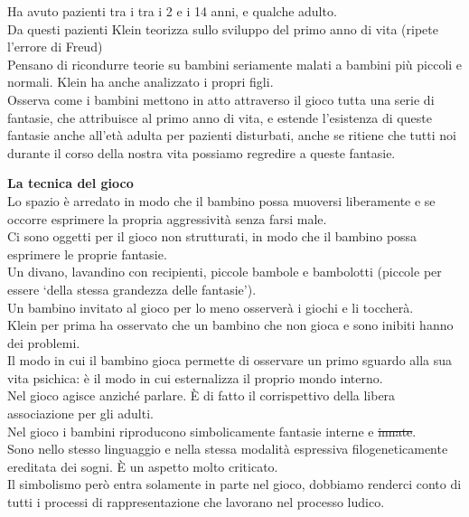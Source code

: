 \documentclass[
]{article}
\begin{document}
Ha avuto pazienti tra i tra i 2 e i 14 anni, e qualche adulto.\\
Da questi pazienti Klein teorizza sullo sviluppo del primo anno di vita
(ripete l'errore di Freud)\\
Pensano di ricondurre teorie su bambini seriamente malati a bambini più
piccoli e normali. Klein ha anche analizzato i propri figli.\\
Osserva come i bambini mettono in atto attraverso il gioco tutta una
serie di fantasie, che attribuisce al primo anno di vita, e estende
l'esistenza di queste fantasie anche all'età adulta per pazienti
disturbati, anche se ritiene che tutti noi durante il corso della nostra
vita possiamo regredire a queste fantasie.

\textbf{La tecnica del gioco}\\
Lo spazio è arredato in modo che il bambino possa muoversi liberamente e
se occorre esprimere la propria aggressività senza farsi male.\\
Ci sono oggetti per il gioco non strutturati, in modo che il bambino
possa esprimere le proprie fantasie.\\
Un divano, lavandino con recipienti, piccole bambole e bambolotti
(piccole per essere `della stessa grandezza delle fantasie').\\
Un bambino invitato al gioco per lo meno osserverà i giochi e li
toccherà.\\
Klein per prima ha osservato che un bambino che non gioca e sono inibiti
hanno dei problemi.\\
Il modo in cui il bambino gioca permette di osservare un primo sguardo
alla sua vita psichica: è il modo in cui esternalizza il proprio mondo
interno.\\
Nel gioco agisce anziché parlare. È di fatto il corrispettivo della
libera associazione per gli adulti.\\
Nel gioco i bambini riproducono simbolicamente fantasie interne e
\sout{innate}.\\
Sono nello stesso linguaggio e nella stessa modalità espressiva
filogeneticamente ereditata dei sogni. È un aspetto molto criticato.\\
Il simbolismo però entra solamente in parte nel gioco, dobbiamo renderci
conto di tutti i processi di rappresentazione che lavorano nel processo
ludico.
\end{document}
